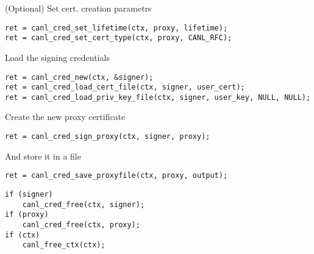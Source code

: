 (Optional) Set cert. creation parametrs
\begin{lstlisting}
ret = canl_cred_set_lifetime(ctx, proxy, lifetime);
ret = canl_cred_set_cert_type(ctx, proxy, CANL_RFC);
\end{lstlisting}

Load the signing credentials
\begin{lstlisting}
ret = canl_cred_new(ctx, &signer);
ret = canl_cred_load_cert_file(ctx, signer, user_cert);
ret = canl_cred_load_priv_key_file(ctx, signer, user_key, NULL, NULL);
\end{lstlisting}

Create the new proxy certificate
\begin{lstlisting}
ret = canl_cred_sign_proxy(ctx, signer, proxy);
\end{lstlisting}

And store it in a file
\begin{lstlisting}
ret = canl_cred_save_proxyfile(ctx, proxy, output);
\end{lstlisting}


\begin{lstlisting}
if (signer)
    canl_cred_free(ctx, signer);
if (proxy)
    canl_cred_free(ctx, proxy);
if (ctx)
    canl_free_ctx(ctx);
\end{lstlisting}
